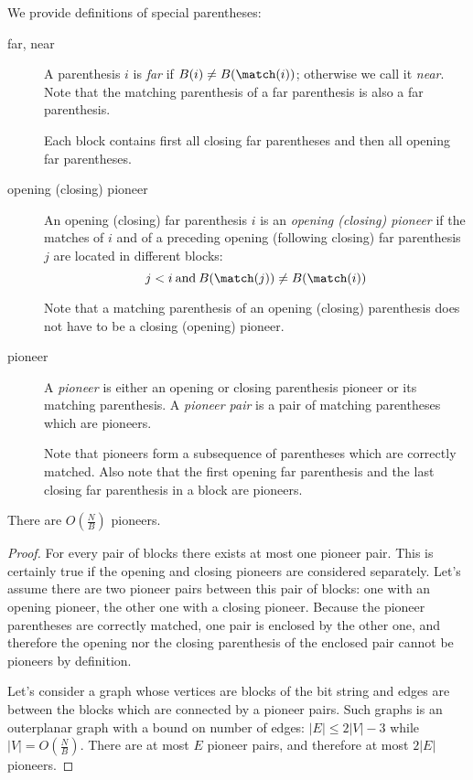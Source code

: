 We provide definitions of special parentheses:
\begin{description}
	\item[far, near] 
	A parenthesis $i$ is \emph{far} if $B(i) \ne B(\match(i))$; otherwise we call it \emph{near}.
	Note that the matching parenthesis of a far parenthesis is also a far parenthesis.
	
	Each block contains first all closing far parentheses and then all opening far parentheses.
	
	\item[opening (closing) pioneer]
	An opening (closing) far parenthesis $i$ is an \emph{opening (closing) pioneer} if the matches of $i$ and of a preceding opening (following closing) far parenthesis $j$ are located in different blocks:
	$$ j < i \booland B(\match(j)) \ne B(\match(i)) $$
	
	Note that a matching parenthesis of an opening (closing) parenthesis does not have to be a closing (opening) pioneer.
	
	\item[pioneer]
	A \emph{pioneer} is either an opening or closing parenthesis pioneer or its matching parenthesis.
	A \emph{pioneer pair} is a pair of matching parentheses which are pioneers.
	
	Note that pioneers form a subsequence of parentheses which are correctly matched.
	Also note that the first opening far parenthesis and the last closing far parenthesis in a block are pioneers.
\end{description}

\begin{lemma}
	There are $O(\frac{N}{B})$ pioneers.
\end{lemma}
\begin{proof}
	For every pair of blocks there exists at most one pioneer pair.
	This is certainly true if the opening and closing pioneers are considered separately.
	Let's assume there are two pioneer pairs between this pair of blocks: one with an opening pioneer, the other one with a closing pioneer.
	Because the pioneer parentheses are correctly matched, one pair is enclosed by the other one, and therefore the opening nor the closing parenthesis of the enclosed pair cannot be pioneers by definition.
	
	Let's consider a graph whose vertices are blocks of the bit string and edges are between the blocks which are connected by a pioneer pairs.
	Such graphs is an outerplanar graph with a bound on number of edges: $|E| \le 2 |V| - 3$ while $|V| = O(\frac{N}{B})$.
	There are at most $E$ pioneer pairs, and therefore at most $2 |E|$ pioneers.
\end{proof}

